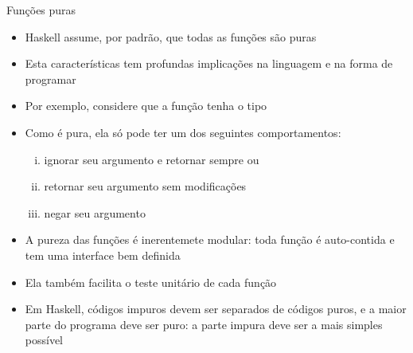 \begin{frame}[fragile]{Funções puras}

    \begin{itemize}
        \item Haskell assume, por padrão, que todas as funções são puras

        \item Esta características tem profundas implicações na linguagem e na forma de programar

        \item Por exemplo, considere que a função  tenha o tipo

        \item Como  é pura, ela só pode ter um dos seguintes comportamentos:

        \begin{enumerate}[i.]
            \item ignorar seu argumento e retornar sempre  ou 

            \item retornar seu argumento sem modificações

            \item negar seu argumento
        \end{enumerate}

        \item A pureza das funções é inerentemete modular: toda função é auto-contida e tem uma
            interface bem definida

        \item Ela também facilita o teste unitário de cada função

        \item Em Haskell, códigos impuros devem ser separados de códigos puros, e a maior parte
            do programa deve ser puro: a parte impura deve ser a mais simples possível
    \end{itemize}

\end{frame}
